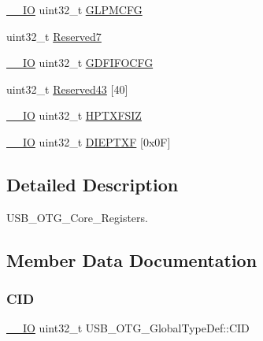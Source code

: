 \begin{DoxyCompactItemize}
\item 
\mbox{\hyperlink{core__sc300_8h_aec43007d9998a0a0e01faede4133d6be}{\+\_\+\+\_\+\+IO}} uint32\+\_\+t \mbox{\hyperlink{struct_u_s_b___o_t_g___global_type_def_ae085e2623371c13a970c3caf3d322ed6}{G\+L\+P\+M\+C\+FG}}
\item 
uint32\+\_\+t \mbox{\hyperlink{struct_u_s_b___o_t_g___global_type_def_a524dfaf02dcdb458b7d36c9af28d537d}{Reserved7}}
\item 
\mbox{\hyperlink{core__sc300_8h_aec43007d9998a0a0e01faede4133d6be}{\+\_\+\+\_\+\+IO}} uint32\+\_\+t \mbox{\hyperlink{struct_u_s_b___o_t_g___global_type_def_a03a213a5cf7e94f475860ae4d7615a23}{G\+D\+F\+I\+F\+O\+C\+FG}}
\item 
uint32\+\_\+t \mbox{\hyperlink{struct_u_s_b___o_t_g___global_type_def_ac9f08b9c782116b581bfbd4b93867b91}{Reserved43}} \mbox{[}40\mbox{]}
\item 
\mbox{\hyperlink{core__sc300_8h_aec43007d9998a0a0e01faede4133d6be}{\+\_\+\+\_\+\+IO}} uint32\+\_\+t \mbox{\hyperlink{struct_u_s_b___o_t_g___global_type_def_ad50445f076f99e6b3d0cfb2643f40fac}{H\+P\+T\+X\+F\+S\+IZ}}
\item 
\mbox{\hyperlink{core__sc300_8h_aec43007d9998a0a0e01faede4133d6be}{\+\_\+\+\_\+\+IO}} uint32\+\_\+t \mbox{\hyperlink{struct_u_s_b___o_t_g___global_type_def_a8027d5b1a53306f5440506ae4915dd52}{D\+I\+E\+P\+T\+XF}} \mbox{[}0x0\+F\mbox{]}
\end{DoxyCompactItemize}


\subsection{Detailed Description}
U\+S\+B\+\_\+\+O\+T\+G\+\_\+\+Core\+\_\+\+Registers. 

\subsection{Member Data Documentation}
\mbox{\label{struct_u_s_b___o_t_g___global_type_def_a5c67046606b7e64fb03c4ac550156156}} 
\subsubsection{\texorpdfstring{CID}{CID}}
{\footnotesize\ttfamily \mbox{\hyperlink{core__sc300_8h_aec43007d9998a0a0e01faede4133d6be}{\+\_\+\+\_\+\+IO}} uint32\+\_\+t U\+S\+B\+\_\+\+O\+T\+G\+\_\+\+Global\+Type\+Def\+::\+C\+ID}

